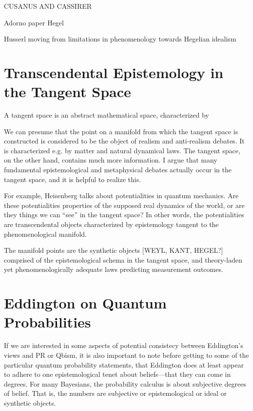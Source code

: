 CUSANUS AND CASSIRER \citep{Cassirer1927}

Adorno paper
Hegel

Husserl moving from limitations in phenomenology towards Hegelian idealism



\section{Transcendental Epistemology in the Tangent Space}

A tangent space is an abstract mathematical space, characterized by 

We can presume that the point on a manifold from which the tangent space is constructed is considered to be the object of realism and anti-realism debates.  It is characterized e.g. by matter and natural dynamical laws.  The tangent space, on the other hand, contains much more information.  I argue that many fundamental epistemological and metaphysical debates actually occur in the tangent space, and it is helpful to realize this.

For example, Heisenberg talks about potentialities in quantum mechanics.  Are these potentialities properties of the supposed real dynamics of the world, or are they things we can ``see'' in the tangent space?  In other words, the potentialities are transcendental objects characterized by epistemology tangent to the phenomenological manifold.

The manifold points are the synthetic objects [WEYL, KANT, HEGEL?] comprised of the epistemological schema in the tangent space, and theory-laden yet phenomenologically adequate laws predicting measurement outcomes.  



\section{Eddington on Quantum Probabilities}

If we are interested in some aspects of potential consistecy between Eddington's views and PR or Qbism, it is also important to note before getting to some of the particular quantum probability statements, that Eddington does at least appear to adhere to one epistemological tenet about beliefs---that they can come in degrees.  For many Bayesians, the probability calculus is about subjective degrees of belief.  That is, the numbers are subjective or epistemological or ideal or synthetic objects.

